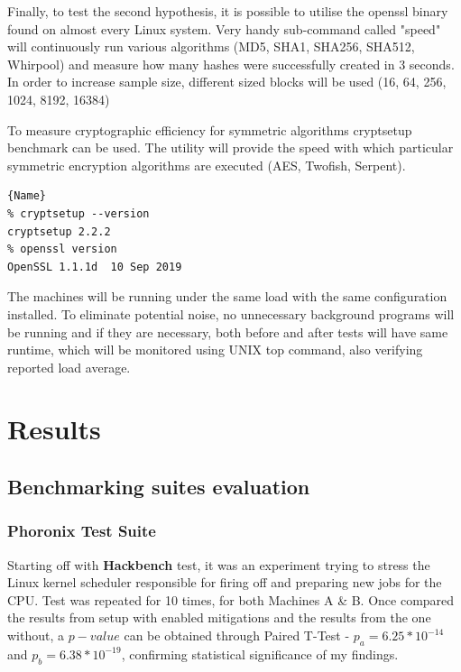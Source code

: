 \documentclass{csfourzero}
\begin{document}
Finally, to test the second hypothesis, it is possible to utilise the openssl binary found on almost every Linux system. Very handy sub-command called "speed" will continuously run various algorithms (MD5, SHA1, SHA256, SHA512, Whirpool) and measure how many hashes were successfully created in 3 seconds. In order to increase sample size, different sized blocks will be used (16, 64, 256, 1024, 8192, 16384)

To measure cryptographic efficiency for symmetric algorithms cryptsetup benchmark can be used. The utility will provide the speed with which particular symmetric encryption algorithms are executed (AES, Twofish, Serpent).

\begin{lstlisting}[caption=Versions of crypsetup and openssl, frame=tlrb, basicstyle=\small]{Name}
% cryptsetup --version
cryptsetup 2.2.2
% openssl version     
OpenSSL 1.1.1d  10 Sep 2019
\end{lstlisting}

The machines will be running under the same load with the same configuration installed. To eliminate potential noise, no unnecessary background programs will be running and if they are necessary, both before and after tests will have same runtime, which will be monitored using UNIX top command, also verifying reported load average. 

\section{Results}
\label{sec:results}

\subsection{Benchmarking suites evaluation}

\subsubsection{Phoronix Test Suite}

Starting off with \textbf{Hackbench} test, it was an experiment trying to stress the Linux kernel scheduler responsible for firing off and preparing new jobs for the CPU. Test was repeated for 10 times, for both Machines A \& B. Once compared the results from setup with enabled mitigations and the results from the one without, a $p-value$ can be obtained through Paired T-Test - $p_{a} = 6.25 * 10^{-14}$ and $p_{b} = 6.38 * 10^{-19}$, confirming statistical significance of my findings. 
\end{document}
